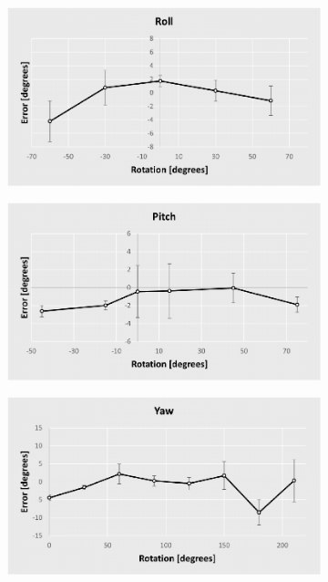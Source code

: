 \begin{figure}[h!]
{\begin{tcolorbox}
\begin{subfigure}[c]{.485\textwidth}
     \end{subfigure}
     \begin{subfigure}[c]{.485\textwidth}
         \centering
         \includegraphics[width=1\textwidth]{Cap5/Figuras/roll.pdf}
     \end{subfigure}
     \hfill
     \begin{subfigure}[c]{.485\textwidth}
         \centering
         \includegraphics[width=1\textwidth]{Cap5/Figuras/pitch.pdf}
     \end{subfigure}
     \hfill
     \begin{subfigure}[c]{.485\textwidth}
         \centering
         \includegraphics[width=1\textwidth]{Cap5/Figuras/yaw.pdf}

\end{subfigure}
\end{tcolorbox}}
\end{figure}
